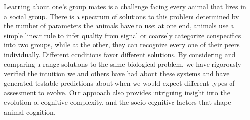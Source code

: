 Learning about one's group mates is a challenge facing every animal that lives in a social group. There is a spectrum of solutions to this problem determined by the number of parameters the animals have to use: at one end, animals use a simple linear rule to infer quality from signal or coarsely categorize conspecifics into two groups, while at the other, they can recognize every one of their peers individually.
Different conditions favor different solutions. By considering and comparing a range solutions to the same biological problem, we have rigorously verified the intuition we and others have had about these systems and have generated testable predictions about when we would expect different types of assessment to evolve. Our approach also provides intriguing insight into the evolution of cognitive complexity, and the socio-cognitive factors that shape animal cognition. 
\newpage



\newpage

